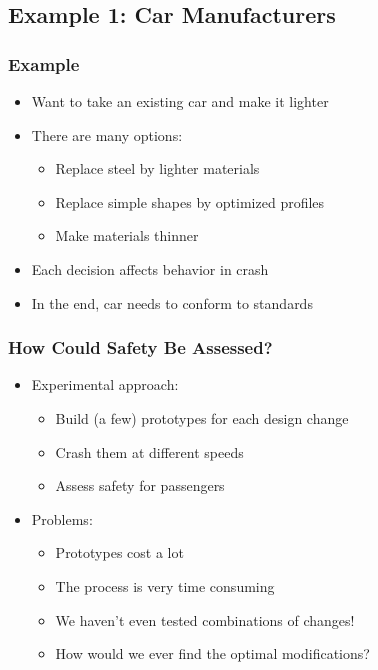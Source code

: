 \documentclass[11pt]{beamer}
\begin{document}
\subsection{Example 1: Car Manufacturers}

\begin{frame}[c]\frametitle{Example}
    \begin{itemize}
        \item Want to take an existing car and make it lighter
        \item There are many options:
        \begin{itemize}
            \item Replace steel by lighter materials
            \item Replace simple shapes by optimized profiles
            \item Make materials thinner
        \end{itemize}
        \item Each decision affects behavior in crash
        \item In the end, car needs to conform to standards
    \end{itemize}
\end{frame}


\begin{frame}[c]\frametitle{How Could Safety Be Assessed?}
    \begin{itemize}
        \item Experimental approach:
        \begin{itemize}
            \item Build (a few) prototypes for each design change
            \item Crash them at different speeds
            \item Assess safety for passengers
        \end{itemize}
        \item Problems:
        \begin{itemize}
            \item Prototypes cost a lot
            \item The process is very time consuming
            \item We haven't even tested combinations of changes!
            \item How would we ever find the optimal modifications?
        \end{itemize}
    \end{itemize}
\end{frame}
\end{document}
